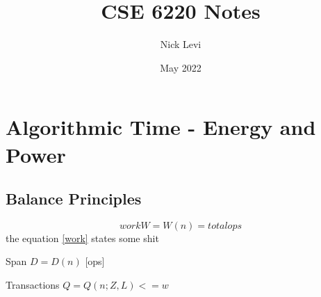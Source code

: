 \documentclass{amsart}
\title{CSE 6220 Notes}
\author{Nick Levi}
\date{May 2022}
\begin{document}
	
	\maketitle
	
	
    \clearpage
    
    \clearpage
	\section{Algorithmic Time - Energy and Power}
	\subsection{Balance Principles}
	\begin{equation} \label{work}
		work W=W(n) = total ops
	\end{equation}
	the equation \ref{work} states some shit
	
	
	Span $D=D(n)$ [ops]
	
	Transactions $Q=Q(n;Z,L)<=w$
	
\end{document}
